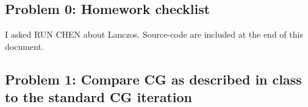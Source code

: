 \documentclass{article}
\begin{document}
 



\hypertarget{problem_0_homework_checklist_2}{}
\subsection*{{Problem 0: Homework checklist}}
\label{}

\checkmark	I asked RUN CHEN about Lanczos. \newline
\checkmark 	Source-code are included at the end of this document. 

\hypertarget{}{}
\subsection*{{Problem 1:  Compare CG as described in class to the standard CG iteration}}
\label{}
\end{document}

